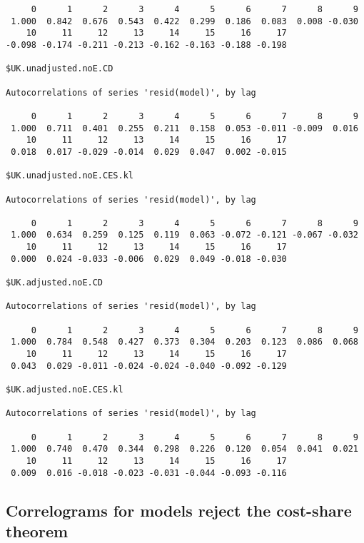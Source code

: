 \documentclass[preprint,authoryear,12pt]{elsarticle}\usepackage[]{graphicx}\usepackage[]{color}
\makeatletter
\newenvironment{kframe}{%
 \def\at@end@of@kframe{}%
 \ifinner\ifhmode%
  \def\at@end@of@kframe{\end{minipage}}%
  \begin{minipage}{\columnwidth}%
 \fi\fi%
 \def\FrameCommand##1{\hskip\@totalleftmargin \hskip-\fboxsep
 \colorbox{shadecolor}{##1}\hskip-\fboxsep
     \hskip-\linewidth \hskip-\@totalleftmargin \hskip\columnwidth}%
 \MakeFramed {\advance\hsize-\width
   \@totalleftmargin\z@ \linewidth\hsize
   \@setminipage}}%
 {\par\unskip\endMakeFramed%
 \at@end@of@kframe}
\newenvironment{knitrout}{}{} %
\makeatother
\begin{document}
\begin{knitrout}
\begin{kframe}
\begin{verbatim}
     0      1      2      3      4      5      6      7      8      9 
 1.000  0.842  0.676  0.543  0.422  0.299  0.186  0.083  0.008 -0.030 
    10     11     12     13     14     15     16     17 
-0.098 -0.174 -0.211 -0.213 -0.162 -0.163 -0.188 -0.198 

$UK.unadjusted.noE.CD

Autocorrelations of series 'resid(model)', by lag

     0      1      2      3      4      5      6      7      8      9 
 1.000  0.711  0.401  0.255  0.211  0.158  0.053 -0.011 -0.009  0.016 
    10     11     12     13     14     15     16     17 
 0.018  0.017 -0.029 -0.014  0.029  0.047  0.002 -0.015 

$UK.unadjusted.noE.CES.kl

Autocorrelations of series 'resid(model)', by lag

     0      1      2      3      4      5      6      7      8      9 
 1.000  0.634  0.259  0.125  0.119  0.063 -0.072 -0.121 -0.067 -0.032 
    10     11     12     13     14     15     16     17 
 0.000  0.024 -0.033 -0.006  0.029  0.049 -0.018 -0.030 

$UK.adjusted.noE.CD

Autocorrelations of series 'resid(model)', by lag

     0      1      2      3      4      5      6      7      8      9 
 1.000  0.784  0.548  0.427  0.373  0.304  0.203  0.123  0.086  0.068 
    10     11     12     13     14     15     16     17 
 0.043  0.029 -0.011 -0.024 -0.024 -0.040 -0.092 -0.129 

$UK.adjusted.noE.CES.kl

Autocorrelations of series 'resid(model)', by lag

     0      1      2      3      4      5      6      7      8      9 
 1.000  0.740  0.470  0.344  0.298  0.226  0.120  0.054  0.041  0.021 
    10     11     12     13     14     15     16     17 
 0.009  0.016 -0.018 -0.023 -0.031 -0.044 -0.093 -0.116 
\end{verbatim}
\end{kframe}
\end{knitrout}


\subsection{Correlograms for models reject the cost-share theorem} 
\label{sec:correlograms_noCST}
\end{document}
